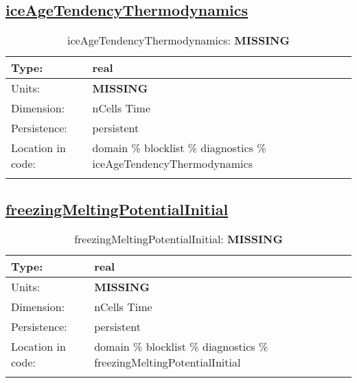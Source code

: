 \subsection[iceAgeTendencyThermodynamics]{\hyperref[sec:var_tab_diagnostics]{iceAgeTendencyThermodynamics}}
\label{subsec:var_sec_diagnostics_iceAgeTendencyThermodynamics}
\begin{center}
\begin{longtable}{| p{2.0in} | p{4.0in} |}
        \hline 
        Type: & real \\
        \hline 
        Units: & {\bf \color{red} MISSING} \\
        \hline 
        Dimension: & nCells Time \\
        \hline 
        Persistence: & persistent \\
        \hline 
         Location in code: & domain \% blocklist \% diagnostics \% iceAgeTendencyThermodynamics \\
         \hline 
    \caption{iceAgeTendencyThermodynamics: {\bf \color{red} MISSING}}
\end{longtable}
\end{center}
\subsection[freezingMeltingPotentialInitial]{\hyperref[sec:var_tab_diagnostics]{freezingMeltingPotentialInitial}}
\label{subsec:var_sec_diagnostics_freezingMeltingPotentialInitial}
\begin{center}
\begin{longtable}{| p{2.0in} | p{4.0in} |}
        \hline 
        Type: & real \\
        \hline 
        Units: & {\bf \color{red} MISSING} \\
        \hline 
        Dimension: & nCells Time \\
        \hline 
        Persistence: & persistent \\
        \hline 
         Location in code: & domain \% blocklist \% diagnostics \% freezingMeltingPotentialInitial \\
         \hline 
    \caption{freezingMeltingPotentialInitial: {\bf \color{red} MISSING}}
\end{longtable}
\end{center}
